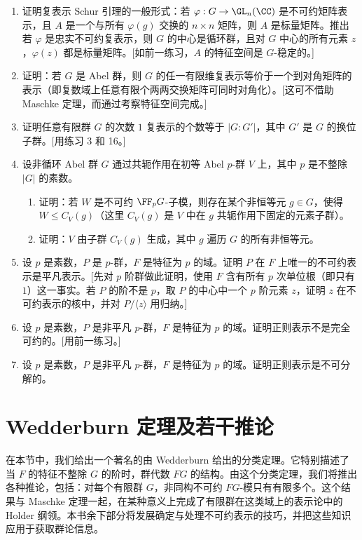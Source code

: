 \begin{enumerate}[label=\arabic*.,resume]
  \item 证明复表示 Schur 引理的一般形式：若 $\varphi:G\to\GL_n(\CC)$ 是不可约矩阵表示，且 $A$ 是一个与所有 $\varphi(g)$ 交换的 $n\times n$ 矩阵，则 $A$ 是标量矩阵。推出若 $\varphi$ 是忠实不可约复表示，则 $G$ 的中心是循环群，且对 $G$ 中心的所有元素 $z$，$\varphi(z)$ 都是标量矩阵。[如前一练习，$A$ 的特征空间是 $G$-稳定的。]
  \item 证明：若 $G$ 是 Abel 群，则 $G$ 的任一有限维复表示等价于一个到对角矩阵的表示（即复数域上任意有限个两两交换矩阵可同时对角化）。[这可不借助 Maschke 定理，而通过考察特征空间完成。]
  \item 证明任意有限群 $G$ 的次数 $1$ 复表示的个数等于 $|G:G'|$，其中 $G'$ 是 $G$ 的换位子群。[用练习 3 和 16。]
  \item 设非循环 Abel 群 $G$ 通过共轭作用在初等 Abel $p$-群 $V$ 上，其中 $p$ 是不整除 $|G|$ 的素数。
  \begin{enumerate}[label=(\alph*)]
    \item 证明：若 $W$ 是不可约 $\FF_pG$-子模，则存在某个非恒等元 $g\in G$，使得 $W\leq C_V(g)$（这里 $C_V(g)$ 是 $V$ 中在 $g$ 共轭作用下固定的元素子群）。
    \item 证明：$V$ 由子群 $C_V(g)$ 生成，其中 $g$ 遍历 $G$ 的所有非恒等元。
  \end{enumerate}
  \item 设 $p$ 是素数，$P$ 是 $p$-群，$F$ 是特征为 $p$ 的域。证明 $P$ 在 $F$ 上唯一的不可约表示是平凡表示。[先对 $p$ 阶群做此证明，使用 $F$ 含有所有 $p$ 次单位根（即只有 $1$）这一事实。若 $P$ 的阶不是 $p$，取 $P$ 的中心中一个 $p$ 阶元素 $z$，证明 $z$ 在不可约表示的核中，并对 $P/\langle z\rangle$ 用归纳。]
  \item 设 $p$ 是素数，$P$ 是非平凡 $p$-群，$F$ 是特征为 $p$ 的域。证明正则表示不是完全可约的。[用前一练习。]
  \item 设 $p$ 是素数，$P$ 是非平凡 $p$-群，$F$ 是特征为 $p$ 的域。证明正则表示是不可分解的。
\end{enumerate}

\section{Wedderburn 定理及若干推论}

在本节中，我们给出一个著名的由 Wedderburn 给出的分类定理。它特别描述了当 $F$ 的特征不整除 $G$ 的阶时，群代数 $FG$ 的结构。由这个分类定理，我们将推出各种推论，包括：对每个有限群 $G$，非同构不可约 $FG$-模只有有限多个。这个结果与 Maschke 定理一起，在某种意义上完成了有限群在这类域上的表示论中的 Holder 纲领。本书余下部分将发展确定与处理不可约表示的技巧，并把这些知识应用于获取群论信息。

